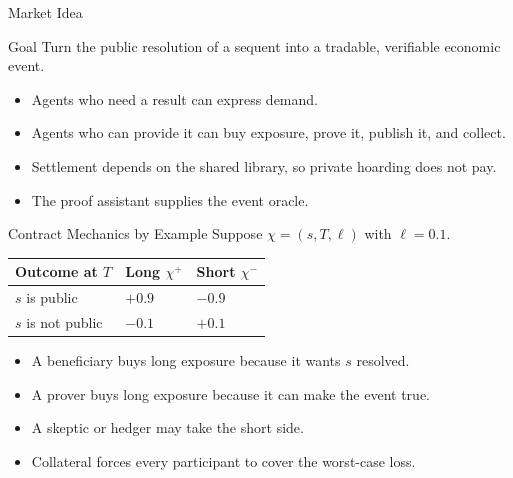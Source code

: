 \documentclass[10pt,aspectratio=169]{beamer}
\begin{document}
\begin{frame}{Market Idea}
\small
\begin{block}{Goal}
Turn the public resolution of a sequent into a tradable, verifiable economic event.
\end{block}

\begin{itemize}
  \item Agents who need a result can express demand.
  \item Agents who can provide it can buy exposure, prove it, publish it, and collect.
  \item Settlement depends on the shared library, so private hoarding does not pay.
  \item The proof assistant supplies the event oracle.
\end{itemize}
\end{frame}

\begin{frame}{Contract Mechanics by Example}
\small
Suppose $\chi=(s,T,\ell)$ with $\ell=0.1$.

\begin{tabular}{p{}p{}p{}}
\toprule
Outcome at $T$ & Long $\chi^+$ & Short $\chi^-$ \\
\midrule
$s$ is public & $+0.9$ & $-0.9$ \\
$s$ is not public & $-0.1$ & $+0.1$ \\
\bottomrule
\end{tabular}

\vspace{1em}
\begin{itemize}
  \item A beneficiary buys long exposure because it wants $s$ resolved.
  \item A prover buys long exposure because it can make the event true.
  \item A skeptic or hedger may take the short side.
  \item Collateral forces every participant to cover the worst-case loss.
\end{itemize}
\end{frame}
\end{document}
